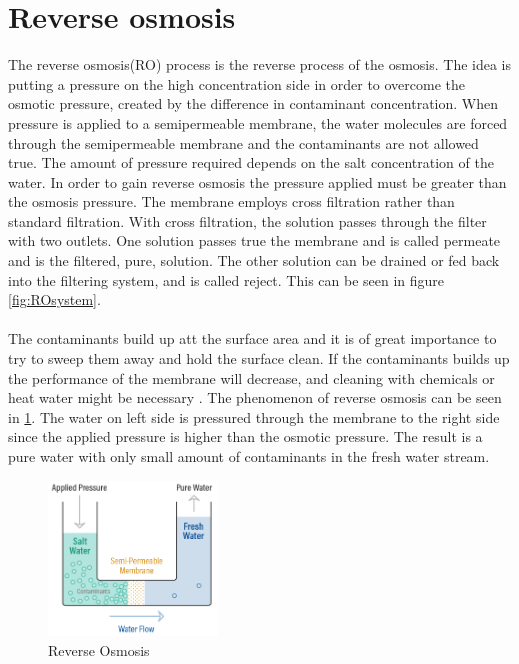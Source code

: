 \section{Reverse osmosis}
\label{RO}
The reverse osmosis(RO) process is the reverse process of the osmosis. The idea is putting a pressure on the high concentration side in order to overcome the osmotic pressure, created by the difference in contaminant concentration. When pressure is applied to a semipermeable membrane, the water molecules are forced through the semipermeable membrane and the contaminants are not allowed true. The amount of pressure required depends on the salt concentration of the water. In order to gain reverse osmosis the pressure applied must be greater than the osmosis pressure. The membrane employs cross filtration rather than standard filtration. With cross filtration, the solution passes through the filter with two outlets. One solution passes true the membrane and is called permeate and is the filtered, pure, solution. The other solution can be drained or fed back into the filtering system, and is called reject. This can be seen in figure \ref{fig:ROsystem}. \\
\\
The contaminants build up att the surface area and it is of great importance to try to sweep them away and hold the surface clean. If the contaminants builds up the performance of the membrane will decrease, and cleaning with chemicals or heat water might be necessary \cite{Puretech}. The phenomenon of reverse osmosis can be seen in \ref{fig:ReverseOsmosis}. The water on left side is pressured through the membrane to the right side since the applied pressure is higher than the osmotic pressure. The result is a pure water with only small amount of contaminants in the fresh water stream. 
\begin{figure}[h]
    \centering
    \includegraphics[width=0.4\textwidth]{ReverseOsmosis}
    \caption{Reverse Osmosis}
    \label{fig:ReverseOsmosis}
\end{figure}

